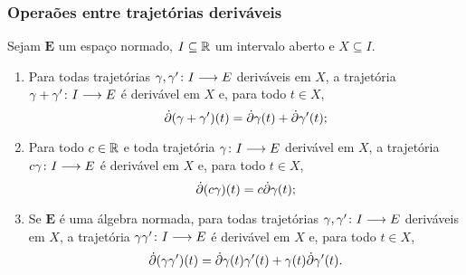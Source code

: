 \subsubsection{Operaões entre trajetórias deriváveis}

\begin{proposition}
\label{prop:derivada.propriedades}
Sejam $\bm E$ um espaço normado, $I \subseteq \mathbb{R}$ um intervalo aberto e $X \subseteq I$.
	\begin{enumerate}
	\item Para todas trajetórias ${\gamma,\gamma'}\colon {I} \longrightarrow {E}$ deriváveis em $X$, a trajetória ${\gamma+\gamma'}\colon {I} \longrightarrow {E}$ é derivável em $X$ e, para todo $t \in X$,
		\begin{equation*}
		\dot{\partial} (\gamma+\gamma')(t) = \dot{\partial} \gamma(t) + \dot{\partial} \gamma'(t);
		\end{equation*}
	\item Para todo $c \in \mathbb{R}$ e toda trajetória ${\gamma}\colon {I} \longrightarrow {E}$ derivável em $X$, a trajetória ${c \gamma}\colon {I} \longrightarrow {E}$ é derivável em $X$ e, para todo $t \in X$,
		\begin{equation*}
		\dot{\partial} (c \gamma)(t) = c\dot{\partial} \gamma(t);
		\end{equation*}
	\item Se $\bm E$ é uma álgebra normada, para todas trajetórias ${\gamma,\gamma'}\colon {I} \longrightarrow {E}$ deriváveis em $X$, a trajetória ${\gamma \gamma'}\colon {I} \longrightarrow {E}$ é derivável em $X$ e, para todo $t \in X$,
		\begin{equation*}
		\dot{\partial} (\gamma \gamma')(t) = \dot{\partial} \gamma(t)\gamma'(t) + \gamma(t)\dot{\partial} \gamma'(t).
		\end{equation*}
	\end{enumerate}
\end{proposition}
